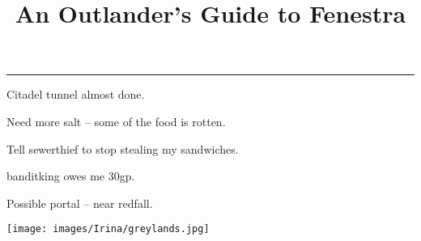 \documentclass[a4paper,openany]{book}
\title{An Outlander's Guide to Fenestra}
\begin{document}
\pagestyle{empty}


\hrule

\vspace{2em}

Citadel tunnel almost done.

Need more salt -- some of the food is rotten.

Tell \gls{sewerthief} to stop stealing my sandwiches.

\Gls{banditking} owes me 30gp.

Possible portal -- near \gls{redfall}.

\pagebreak

\texttt{[image: images/Irina/greylands.jpg]}
\end{document}
